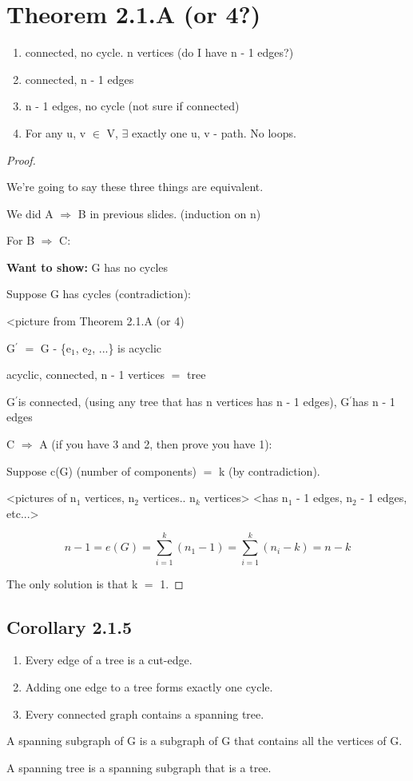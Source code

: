 \documentclass{article}
\newcommand{\mt}[1]{\ensuremath{#1}}
\newcommand\bsc[2][\DefaultOpt]{%
  \def\DefaultOpt{#2}%
  \section[#1]{#2}%
}
\newcommand\ssc[2][\DefaultOpt]{%
  \def\DefaultOpt{#2}%
  \subsection[#1]{#2}%
}
\newcommand{\bgpf}{\begin{proof} $ $\newline}
\newcommand{\balist}{\begin{enumerate}[label=\alph*.]}
\newcommand{\elist}{\end{enumerate}}
\newcommand{\wts}[1]{\textbf{Want to show: } #1}
\newcommand{\epf}{\end{proof}}
\newcommand{\mem}{\mt{\in} }
\newcommand{\exs}{\mt{\exists} }
\newcommand{\rar}{ \mt{\Rightarrow} }     %
\newcommand{\bk}[1]{\{#1\}}
\newcommand{\ms}{\mt{\operatorname{-}} }
\newcommand{\eql}{ \mt{\operatorname{=}} }
\newcommand{\pr}{\mt{^\prime}} 		   %
\newcommand{\uw}[2]{#1\mt{_{#2}}}
\newcommand{\eqn}[1]{\[#1\]}
\begin{document}
\bsc{Theorem 2.1.A (or 4?)}{

\balist
\item connected, no cycle. n vertices (do I have n \ms 1 edges?)
\item connected, n \ms 1 edges
\item n \ms 1 edges, no cycle (not sure if connected)
\item For any u, v \mem V, \exs exactly one u, v \ms path. No loops.
\elist

\bgpf

We're going to say these three things are equivalent.

We did A \rar B in previous slides. (induction on n)

For B \rar C:

\wts{G has no cycles}

Suppose G has cycles (contradiction):

<picture from Theorem 2.1.A (or 4)

G\pr \eql G \ms \bk{\uw{e}{1}, \uw{e}{2}, ...} is acyclic

acyclic, connected, n \ms 1 vertices \eql tree 

G\pr is connected, (using any tree that has n vertices has n \ms 1 edges), G\pr has n \ms 1 edges

C \rar A (if you have 3 and 2, then prove you have 1):

Suppose c(G) (number of components) \eql k (by contradiction).

<pictures of \uw{n}{1} vertices, \uw{n}{2} vertices.. \uw{n}{k} vertices>
<has \uw{n}{1} \ms 1 edges, \uw{n}{2} \ms 1 edges, etc...>

\eqn{n - 1 = e(G) = \sum_{i = 1}^k (\uw{n}{1} - 1) = \sum_{i = 1}^k (\uw{n}{i} - k) = n - k}

The only solution is that k \eql 1.

\epf

}

\ssc{Corollary 2.1.5}{

\balist
\item Every edge of a tree is a cut-edge.
\item Adding one edge to a tree forms exactly one cycle.
\item Every connected graph contains a spanning tree.
\elist

}

A spanning subgraph of G is a subgraph of G that contains all the vertices of G.

A spanning tree is a spanning subgraph that is a tree.
\end{document}
